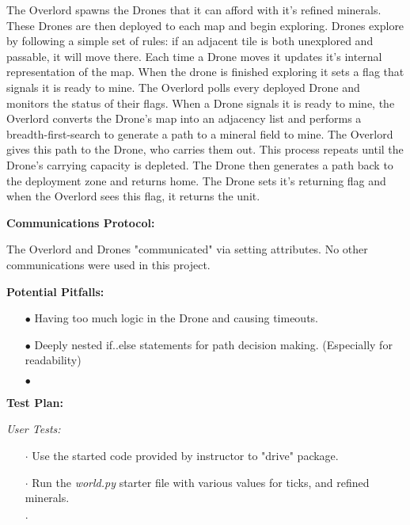 \documentclass{article}
\begin{document}
The Overlord spawns the Drones that it can afford with it's refined 
minerals.  These Drones are then deployed to each map and begin exploring.
Drones explore by following a simple set of rules: if an adjacent tile is
both unexplored and passable, it will move there. Each time a Drone moves
it updates it's internal representation of the map. When the drone is
finished exploring it sets a flag that signals it is ready to mine.  The 
Overlord polls every deployed Drone and monitors the status of their flags.
When a Drone signals it is ready to mine, the Overlord converts the Drone's
map into an adjacency list and performs a breadth-first-search to generate 
a path to a mineral field to mine.  The Overlord gives this path to the 
Drone, who carries them out. This process repeats until the Drone's 
carrying capacity is depleted.  The Drone then generates a path back to the
deployment zone and returns home.  The Drone sets it's returning flag and
when the Overlord sees this flag, it returns the unit.

\begin{flushleft}
\textbf{Communications Protocol:}
\vspace{.5pc}
\end{flushleft}

The Overlord and Drones "communicated" via setting attributes.  No other 
communications were used in this project.

\begin{flushleft}
\textbf{Potential Pitfalls:}
\vspace{.5pc}
\end{flushleft}

\begin{itemize}
	\item[$\bullet$] Having too much logic in the Drone and causing 
	timeouts.
	\item[$\bullet$] Deeply nested if..else statements for path decision
	making. (Especially for readability)
	\item[$\bullet$] 
\end{itemize}

\begin{flushleft}
\textbf{Test Plan:}
\vspace{.5pc}
\end{flushleft}

\textit{User Tests:}
\begin{itemize}
	\item[$\cdot$] Use the started code provided by instructor to "drive"
	package.
	\item[$\cdot$] Run the \textit{world.py} starter file with various
	values for ticks, and refined minerals.
	\item[$\cdot$] 
\end{itemize}
\end{document}
